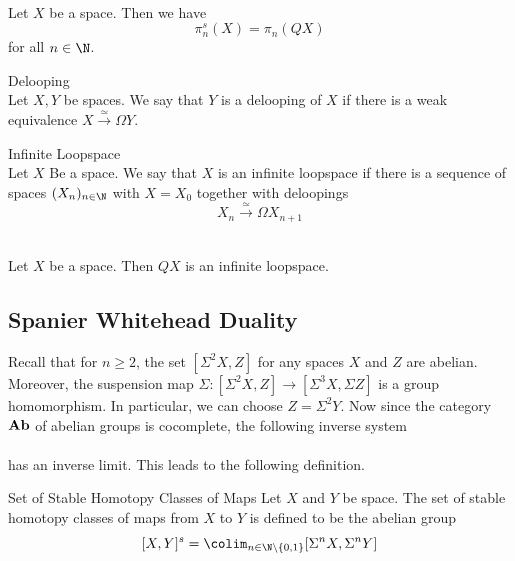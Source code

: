 \documentclass[a4paper]{article}
\begin{document}
\begin{lmm}{}{}\\
Let $X$ be a space. Then we have $$\pi_n^s(X)=\pi_n(QX)$$ for all $n\in\N$. 
\end{lmm}

\begin{defn}{Delooping}{}\\
Let $X,Y$ be spaces. We say that $Y$ is a delooping of $X$ if there is a weak equivalence $X\overset{\simeq}{\to}\Omega Y$. 
\end{defn}

\begin{defn}{Infinite Loopspace}{}\\
Let $X$ Be a space. We say that $X$ is an infinite loopspace if there is a sequence of spaces $(X_n)_{n\in\N}$ with $X=X_0$ together with deloopings $$X_n\overset{\simeq}{\to}\Omega X_{n+1}$$
\end{defn}

\begin{lmm}{}{}\\
Let $X$ be a space. Then $QX$ is an infinite loopspace. 
\end{lmm}

\subsection{Spanier Whitehead Duality}
Recall that for $n\geq 2$, the set $[\Sigma^2X,Z]$ for any spaces $X$ and $Z$ are abelian. Moreover, the suspension map $\Sigma:[\Sigma^2X,Z]\to[\Sigma^3X,\Sigma Z]$ is a group homomorphism. In particular, we can choose $Z=\Sigma^2Y$. Now since the category $\bold{Ab}$ of abelian groups is cocomplete, the following inverse system \\
\\
has an inverse limit. This leads to the following definition. 

\begin{defn}{Set of Stable Homotopy Classes of Maps}{} Let $X$ and $Y$ be space. The set of stable homotopy classes of maps from $X$ to $Y$ is defined to be the abelian group $$[X,Y]^s=\colim_{n\in\N\setminus\{0,1\}}[\Sigma^nX,\Sigma^nY]$$
\end{defn}
\end{document}
